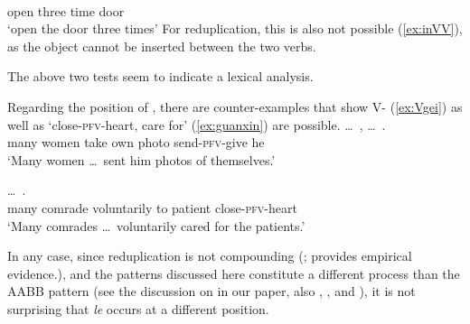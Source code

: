 \documentclass[fleqn,twoside]{article}
\begin{document}
\begin{enumerate}
\ex  \gll {}    \\
open three time door\\
\glt `open the door three times'
\z\z
For reduplication, this is also not possible (\ref{ex:inVV}), as the object cannot be inserted between the two verbs.
\ea\label{ex:inVV}

\z\z

The above two tests seem to indicate a lexical analysis.

Regarding the position of , there are counter-examples that show V- (\ref{ex:Vgei}) as well as  `close-\textsc{pfv}-heart, care for' (\ref{ex:guanxin}) are possible.
\ea\label{ex:Vgei}%
\gll \ldots\,  ,    \ldots\,  .\\
{} many women take own photo {} send-\textsc{pfv}-give he\\
\glt `Many women \ldots\, sent him photos of themselves.'
\z

\ea\label{ex:guanxin}%
\gll {}  \ldots\,    .\\
many comrade {} voluntarily to patient close-\textsc{pfv}-heart\\
\glt `Many comrades \ldots\, voluntarily cared for the patients.'
\z

In any case, since reduplication is not compounding (\citealt[149--150]{Sui2018}; \citealt{GaoEtAl2021} provides empirical evidence.),
and the patterns discussed here constitute a different process than the AABB pattern
(see the discussion on \citealt{Xie2020} in our paper, also \citealt[Sec. 4.3]{Deng2013}, \citealt[Sec. 2]{SuiHu2016}, \citealt{Sui2018} and \citealt{Wang2023}),
it is not surprising that \textit{le} occurs at a different position.


\end{enumerate}
\end{document}
